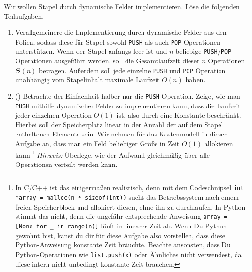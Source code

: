 \documentclass{uebung_cs}
\begin{document}
\begin{aufgabe}
	Wir wollen Stapel durch dynamische Felder implementieren.
	Löse die folgenden Teilaufgaben.
	\begin{enumerate}
		\item %
    Verallgemeinere die Implementierung durch dynamische Felder aus den Folien, sodass diese für Stapel sowohl \texttt{PUSH} als auch \texttt{POP} Operationen unterstützen.
		Wenn der Stapel anfangs leer ist und $n$ beliebige \texttt{PUSH}/\texttt{POP} Operationen ausgeführt werden, soll die Gesamtlaufzeit dieser $n$ Operationen $\Theta(n)$ betragen. Außerdem soll jede einzelne \texttt{PUSH} und \texttt{POP} Operation unabhängig vom Stapelinhalt maximale Laufzeit $O(n)$ haben.
		\item (\veryhard) Betrachte der Einfachheit halber nur die \texttt{PUSH} Operation.
		Zeige, wie man \texttt{PUSH} mithilfe dynamischer Felder so implementieren kann, dass die Laufzeit jeder einzelnen Operation $O(1)$ ist, also durch eine Konstante beschränkt.
		Hierbei soll der Speicherplatz linear in der Anzahl der auf dem Stapel enthaltenen Elemente sein.
		Wir nehmen für das Kostenmodell in dieser Aufgabe an, dass man ein Feld beliebiger Größe in Zeit $O(1)$ allokieren kann.\footnote{In C/C++ ist das einigermaßen realistisch, denn mit dem Codeschnipsel \texttt{int *array = malloc(n * sizeof(int))} sucht das Betriebssystem nach einem freien Speicherblock und allokiert diesen, ohne ihn zu durchlaufen.
    In Python stimmt das nicht, denn die ungefähr entsprechende Anweisung \texttt{array = [None for \_ in range(n)]} läuft in linearer Zeit ab.
    Wenn Du Python gewohnt bist, kanst du dir für diese Aufgabe also vorstellen, dass diese Python-Anweisung konstante Zeit bräuchte.
    Beachte ansonsten, dass Du Python-Operationen wie \texttt{list.push(x)} oder Ähnliches nicht verwendest, da diese intern nicht unbedingt konstante Zeit brauchen.}
		\textit{Hinweis:} Überlege, wie der Aufwand gleichmäßig über alle Operationen verteilt werden kann. 
	\end{enumerate}
\end{aufgabe}
\end{document}
